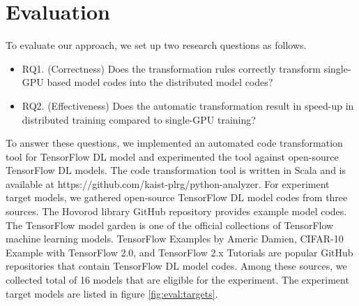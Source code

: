 \section{Evaluation}\label{sec:eval}

To evaluate our approach, we set up two research questions as follows.

\begin{itemize}
\item RQ1. (Correctness) Does the transformation rules 
correctly transform single-GPU based model codes into
the distributed model codes?

\item RQ2. (Effectiveness) Does the automatic transformation result in speed-up 
in distributed training compared to single-GPU training?
\end{itemize}

To answer these questions, we implemented an automated code transformation tool
for TensorFlow DL model and experimented the tool against open-source
TensorFlow DL models. The code transformation tool is written in Scala and
is available at https://github.com/kaist-plrg/python-analyzer.
For experiment target models, we gathered open-source TensorFlow DL model
codes from three sources.
The Hovorod library GitHub repository\cite{horovodgithub} provides
example model codes. The TensorFlow model garden\cite{tfmodelgarden} is one of
the official collections of TensorFlow machine learning models. 
TensorFlow Examples by Americ Damien\cite{tfexmaplesdamien},
CIFAR-10 Example with TensorFlow 2.0\cite{cifar10github}, and
TensorFlow 2.x Tutorials\cite{tf2tutogithub} are popular GitHub repositories
that contain TensorFlow DL model codes.
Among these sources, we collected total of 16 models that are eligible
for the experiment.
The experiment target models are listed in figure \ref{fig:eval:targets}. 


